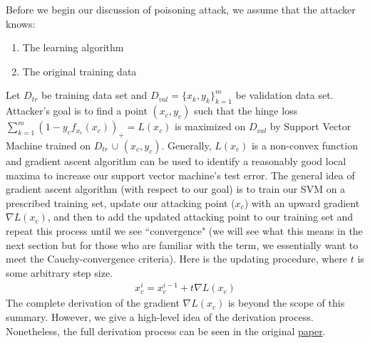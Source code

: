 \documentclass[twoside]{article}
\begin{document}
Before we begin our discussion of poisoning attack, we assume that the attacker knows:
\begin{enumerate}
    \item The learning algorithm
    \item The original training data
\end{enumerate}


Let $D_{tr}$ be training data set and $D_{val} = \{x_k,y_k\}_{k=1}^{m}$ be validation data set. Attacker's goal is to find a point $(x_c,y_c)$ such that the hinge loss $\sum_{k=1}^{m}(1-y_{c}f_{x_{c}}(x_{c}))_{+} = L(x_c)$ is maximized on $D_{val}$ by Support Vector Machine trained on $D_{tr}$ $\cup$ $(x_{c},y_{c})$. Generally, $L(x_c)$ is a non-convex function and gradient ascent algorithm can be used to identify a reasonably good local maxima to increase our support vector machine's test error. The general idea of gradient ascent algorithm (with respect to our goal) is to train our SVM on a prescribed training set, update our attacking point ($x_c$) with an upward gradient $\nabla{L(x_{c})}$, and then to add the updated attacking point to our training set and repeat this process until we see ``convergence" (we will see what this means in the next section but for those who are familiar with the term, we essentially want to meet the Cauchy-convergence criteria). Here is the updating procedure, where $t$ is some arbitrary step size.
\begin{align*}
    x_{c}^{i} = x_{c}^{i-1} + t\nabla{L(x_{c})}
\end{align*}
The complete derivation of the gradient $\nabla{L(x_{c})}$ is beyond the scope of this summary. However, we give a high-level idea of the derivation process. Nonetheless, the full derivation process can be seen in the original \textcolor{blue}{\href{https://arxiv.org/pdf/1206.6389.pdf}{paper}}.
\end{document}
